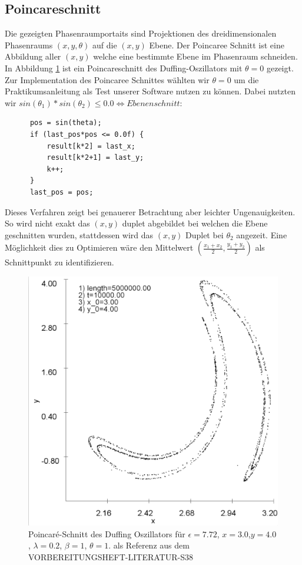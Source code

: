 \documentclass{scrartcl}
\begin{document}
\subsection{ Poincareschnitt }
Die gezeigten Phasenraumportaits sind Projektionen des dreidimensionalen Phasenraums $(x,y,\theta)$ auf die $(x,y)$ Ebene. Der Poincaree Schnitt ist eine Abbildung aller $(x,y)$ welche eine bestimmte Ebene im Phasenraum schneiden. In Abbildung \ref{img:poincare-772} ist ein Poincareschnitt des Duffing-Oszillators mit $\theta=0$ gezeigt. Zur Implementation des Poincaree Schnittes wählten wir $\theta=0$ um die Praktikumsanleitung als Test unserer Software nutzen zu können. Dabei nutzten wir $sin(\theta_1)*sin(\theta_2) \leq 0.0 \iff Ebenenschnitt$:
\begin{lstlisting}
      pos = sin(theta);
      if (last_pos*pos <= 0.0f) {
          result[k*2] = last_x;
          result[k*2+1] = last_y;
          k++;
      }
      last_pos = pos;
\end{lstlisting}
Dieses Verfahren zeigt bei genauerer Betrachtung aber leichter Ungenauigkeiten. So wird nicht exakt das $(x,y)$ duplet abgebildet bei welchen die Ebene geschnitten wurden, stattdessen wird das $(x,y)$ Duplet bei $\theta_2$ angezeit. Eine Möglichkeit dies zu Optimieren wäre den Mittelwert $(\frac{x_1+x_2}{2}, \frac{y_1 + y_2}{2})$ als Schnittpunkt zu identifizieren.
\begin{figure}[!htbp]
	\centering
	\includegraphics[scale=0.20]{poincare-772}
	\caption{Poincaré-Schnitt des Duffing Oszillators für $\epsilon=7.72$, $x=3.0$,$ y=4.0$, $\lambda=0.2$, $\beta=1$, $\theta=1$. als Referenz aus dem VORBEREITUNGSHEFT-LITERATUR-S38}
	\label{img:poincare-772}
\end{figure}
\end{document}
